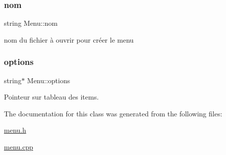\mbox{\label{class_menu_a99574cb51606811f697854859bc1ccc1}} 
\subsubsection{\texorpdfstring{nom}{nom}}
{\footnotesize\ttfamily string Menu\+::nom\hspace{0.3cm}{\ttfamily [private]}}



nom du fichier à ouvrir pour créer le menu 

\mbox{\label{class_menu_aec975cfea9216420d5754ce2e9321390}} 
\subsubsection{\texorpdfstring{options}{options}}
{\footnotesize\ttfamily string$\ast$ Menu\+::options\hspace{0.3cm}{\ttfamily [private]}}



Pointeur sur tableau des items. 



The documentation for this class was generated from the following files\+:\begin{DoxyCompactItemize}
\item 
\hyperlink{menu_8h}{menu.\+h}\item 
\hyperlink{menu_8cpp}{menu.\+cpp}\end{DoxyCompactItemize}
